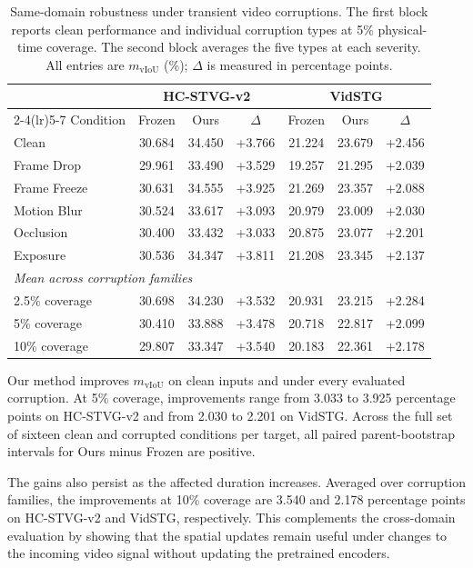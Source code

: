\documentclass[10pt,twocolumn,letterpaper]{article}
\newcommand{\mvIoU}{\ensuremath{m_{\mathrm{vIoU}}}}
\begin{document}
\begin{table}[t]
	\centering
	\caption{Same-domain robustness under transient video
		corruptions. The first block reports clean performance and
		individual corruption types at 5\% physical-time coverage.
		The second block averages the five types at each severity.
		All entries are \mvIoU{} (\%); $\Delta$ is measured in
		percentage points.}
	\label{tab:robustness}
	\setlength{\tabcolsep}{7pt}
	\small
	\begin{tabular}{lcccccc}
		\toprule
		& \multicolumn{3}{c}{HC-STVG-v2} & \multicolumn{3}{c}{VidSTG} \\
		\cmidrule(lr){2-4}\cmidrule(lr){5-7}
		Condition & Frozen & Ours & $\Delta$ & Frozen & Ours & $\Delta$ \\
		\midrule
		Clean            & 30.684 & 34.450 & +3.766 & 21.224 & 23.679 & +2.456 \\
		Frame Drop       & 29.961 & 33.490 & +3.529 & 19.257 & 21.295 & +2.039 \\
		Frame Freeze     & 30.631 & 34.555 & +3.925 & 21.269 & 23.357 & +2.088 \\
		Motion Blur      & 30.524 & 33.617 & +3.093 & 20.979 & 23.009 & +2.030 \\
		Occlusion        & 30.400 & 33.432 & +3.033 & 20.875 & 23.077 & +2.201 \\
		Exposure         & 30.536 & 34.347 & +3.811 & 21.208 & 23.345 & +2.137 \\
		\midrule
		\multicolumn{7}{l}{\textit{Mean across corruption families}} \\
		\midrule
		2.5\% coverage   & 30.698 & 34.230 & +3.532 & 20.931 & 23.215 & +2.284 \\
		5\% coverage     & 30.410 & 33.888 & +3.478 & 20.718 & 22.817 & +2.099 \\
		10\% coverage    & 29.807 & 33.347 & +3.540 & 20.183 & 22.361 & +2.178 \\
		\bottomrule
	\end{tabular}
\end{table}

Our method improves \mvIoU{} on clean inputs and under
every evaluated corruption. At 5\% coverage, improvements
range from 3.033 to 3.925 percentage points on HC-STVG-v2
and from 2.030 to 2.201 on VidSTG. Across the full set of
sixteen clean and corrupted conditions per target, all
paired parent-bootstrap intervals for Ours minus Frozen
are positive.

The gains also persist as the affected duration increases.
Averaged over corruption families, the improvements at
10\% coverage are 3.540 and 2.178 percentage points on
HC-STVG-v2 and VidSTG, respectively. This complements
the cross-domain evaluation by showing that the spatial
updates remain useful under changes to the incoming video
signal without updating the pretrained encoders.
\end{document}

